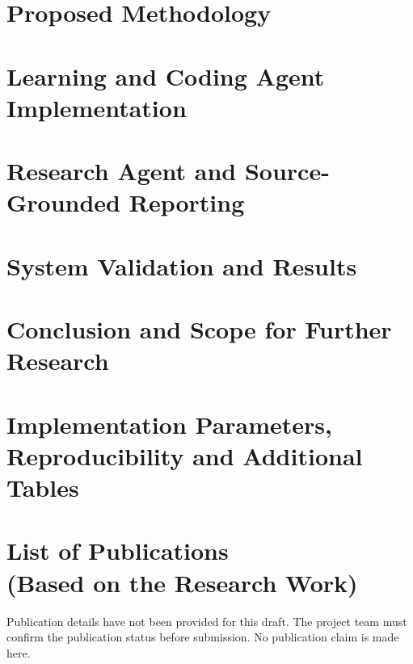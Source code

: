 \documentclass[a4paper,12pt]{report}
\begin{document}
\chapter{Proposed Methodology}
\chapter{Learning and Coding Agent Implementation}
\chapter{Research Agent and Source-Grounded Reporting}
\chapter{System Validation and Results}
\chapter{Conclusion and Scope for Further Research}
\appendix
\chapter{Implementation Parameters, Reproducibility and Additional Tables}

\clearpage
\renewcommand{\bibname}{References}


\chapter*{List of Publications \\ \large(Based on the Research Work)}
Publication details have not been provided for this draft. The project team must confirm the publication status before submission. No publication claim is made here.
\end{document}
